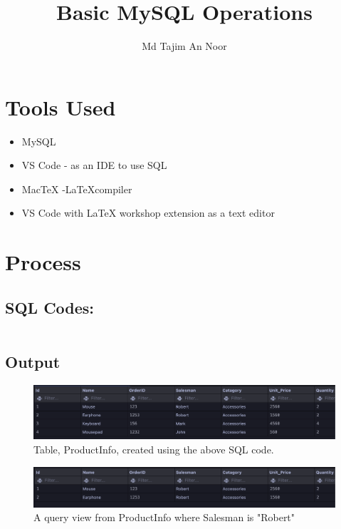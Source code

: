 \documentclass[12pt]{article}
\title{Basic MySQL Operations}
\author{Md Tajim An Noor}
\date{}
\begin{document}

\pagebreak

\tableofcontents

\maketitle

\section{Tools Used}
\begin{itemize}
    \item MySQL
    \item VS Code - as an IDE to use SQL
    \item MacTeX -\LaTeX  compiler
    \item VS Code with LaTeX workshop extension as a text editor
\end{itemize}


\section{Process}

\subsection{SQL Codes:}
\inputminted[breaklines]{SQL}{codes/Product.session.sql}

\subsection{Output}
\begin{figure}[!ht]
    \includegraphics[width=\linewidth]{images/table.png}
    \caption{Table, ProductInfo, created using the above SQL code.}
    \label{fig:table}
\end{figure}
\begin{figure}[!ht]
    \includegraphics[width=\linewidth]{images/select.png}
    \caption{A query view from ProductInfo where Salesman is "Robert"}
    \label{fig:query}
\end{figure}
\end{document}
